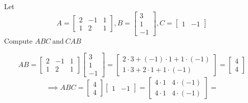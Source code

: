 \documentclass[a4paper, 11pt]{article}
\begin{document}
\begin{problem} 
Let \[
    A = \left[\begin{array}{ccc}
            2 & -1 & 1 \\
            1 & 2  & 1
        \end{array}\right],
    B = \left[\begin{array}{c}
            3 \\
            1 \\
            -1
        \end{array}\right],
    C = \left[\begin{array}{cc}
            1 & -1
        \end{array}\right]
\]
Compute \(ABC \:\text{and}\:  CAB\)
\end{problem}
\begin{solution}
    \[
        AB = \left[\begin{array}{ccc}
                2 & -1 & 1 \\
                1 & 2  & 1
            \end{array}\right]\left[\begin{array}{c}
                3 \\
                1 \\
                -1
            \end{array}\right] =
        \left[\begin{array}{cc}
                2 \cdot 3 + (-1) \cdot 1 + 1 \cdot (-1) \\
                1 \cdot 3 + 2 \cdot 1 + 1 \cdot (-1)
            \end{array}\right] =
        \left[\begin{array}{cc}
                4 \\
                4
            \end{array}\right]
    \]
    \[
        \implies ABC = \left[\begin{array}{cc}
                4 \\
                4
            \end{array}\right] \left[\begin{array}{cc}
                1 & -1
            \end{array}\right] =
        \left[\begin{array}{cc}
                4 \cdot 1 & 4 \cdot (-1) \\
                4 \cdot 1 & 4 \cdot (-1)
            \end{array}\right] =
\]
\end{solution}
\end{document}
